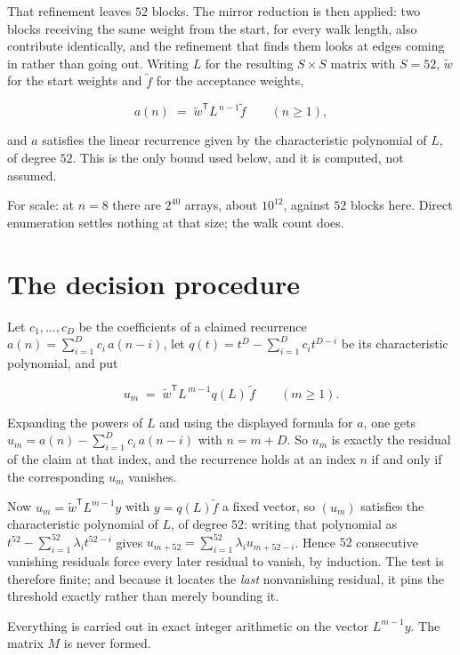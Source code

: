 \documentclass[11pt]{article}
\theoremstyle{definition}
\begin{document}
That refinement leaves $52$ blocks. The mirror reduction is then applied: two blocks receiving the same weight from the start, for every walk length, also contribute identically, and the refinement that finds them looks at edges coming in rather than going out. Writing $L$ for the resulting $S \times S$ matrix with $S = 52$, $\tilde w$ for the start weights and $\tilde f$ for the acceptance weights,

\[a(n) \;=\; \tilde w^{\mathsf T} L^{\,n-1} \tilde f \qquad (n \ge 1),\]

and $a$ satisfies the linear recurrence given by the characteristic polynomial of $L$, of degree $52$. This is the only bound used below, and it is computed, not assumed.

For scale: at $n = 8$ there are $2^{40}$ arrays, about $10^{12}$, against $52$ blocks here. Direct enumeration settles nothing at that size; the walk count does.

\section{The decision procedure}

Let $c_1,\dots,c_D$ be the coefficients of a claimed recurrence $a(n) = \sum_{i=1}^{D} c_i\,a(n-i)$, let $q(t) = t^{D} - \sum_{i=1}^{D} c_i t^{D-i}$ be its characteristic polynomial, and put

\[u_m \;=\; \tilde w^{\mathsf T} L^{\,m-1} q(L)\,\tilde f \qquad (m \ge 1).\]

Expanding the powers of $L$ and using the displayed formula for $a$, one gets $u_m = a(n) - \sum_{i=1}^{D} c_i\,a(n-i)$ with $n = m + D$. So $u_m$ is exactly the residual of the claim at that index, and the recurrence holds at an index $n$ if and only if the corresponding $u_m$ vanishes.

Now $u_m = \tilde w^{\mathsf T} L^{m-1} y$ with $y = q(L)\tilde f$ a fixed vector, so $(u_m)$ satisfies the characteristic polynomial of $L$, of degree $52$: writing that polynomial as $t^{52} - \sum_{i=1}^{52} \lambda_i t^{52-i}$ gives $u_{m+52} = \sum_{i=1}^{52} \lambda_i u_{m+52-i}$. Hence $52$ consecutive vanishing residuals force every later residual to vanish, by induction. The test is therefore finite; and because it locates the {\itshape last} nonvanishing residual, it pins the threshold exactly rather than merely bounding it.

Everything is carried out in exact integer arithmetic on the vector $L^{m-1}y$. The matrix $M$ is never formed.
\end{document}
